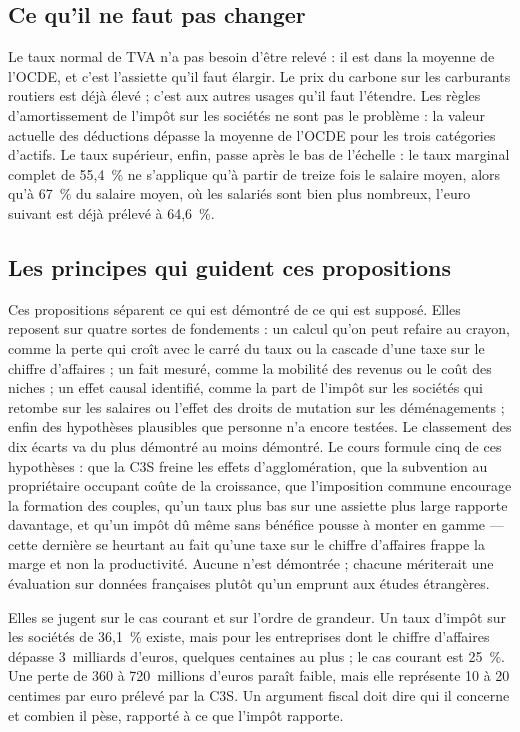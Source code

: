 \documentclass[11pt,a4paper]{article}
\begin{document}
\subsection{Ce qu'il ne faut pas changer}

Le taux normal de TVA n'a pas besoin d'être relevé : il est dans la moyenne de l'OCDE, et c'est
l'assiette qu'il faut élargir. Le prix du carbone sur les carburants routiers est déjà élevé ; c'est
aux autres usages qu'il faut l'étendre. Les règles d'amortissement de l'impôt sur les sociétés ne
sont pas le problème : la valeur actuelle des déductions dépasse la moyenne de l'OCDE pour les trois
catégories d'actifs. Le taux supérieur, enfin, passe après le bas de l'échelle : le taux
marginal complet de 55,4~\% ne s'applique qu'à partir de treize fois le salaire moyen, alors qu'à
67~\% du salaire moyen, où les salariés sont bien plus nombreux, l'euro suivant est déjà prélevé à
64,6~\%.

\subsection{Les principes qui guident ces propositions}

Ces propositions séparent ce qui est démontré de ce qui est supposé. Elles reposent sur quatre
sortes de fondements : un calcul qu'on peut refaire au crayon, comme la perte qui croît avec le
carré du taux ou la cascade d'une taxe sur le chiffre d'affaires ; un fait mesuré, comme la mobilité
des revenus ou le coût des niches ; un effet causal identifié, comme la part de l'impôt sur les
sociétés qui retombe sur les salaires ou l'effet des droits de mutation sur les déménagements ;
enfin des hypothèses plausibles que personne n'a encore testées. Le classement des dix écarts va
du plus démontré au moins démontré. Le cours formule cinq de ces hypothèses : que la C3S freine les
effets d'agglomération, que la subvention au propriétaire occupant coûte de la croissance, que
l'imposition commune encourage la formation des couples, qu'un taux plus bas sur une assiette plus
large rapporte davantage, et qu'un impôt dû même sans bénéfice pousse à monter en gamme --- cette
dernière se heurtant au fait qu'une taxe sur le chiffre d'affaires frappe la marge et non la
productivité. Aucune n'est démontrée ; chacune mériterait une évaluation sur données françaises
plutôt qu'un emprunt aux études étrangères.

Elles se jugent sur le cas courant et sur l'ordre de grandeur. Un taux d'impôt sur les sociétés de
36,1~\% existe, mais pour les entreprises dont le chiffre d'affaires dépasse 3~milliards
d'euros, quelques centaines au plus ; le cas courant est 25~\%. Une perte de 360 à
720~millions d'euros paraît faible, mais elle représente 10 à 20 centimes par euro prélevé par la
C3S. Un argument fiscal doit dire qui il concerne et combien il pèse, rapporté à ce que l'impôt
rapporte.
\end{document}
